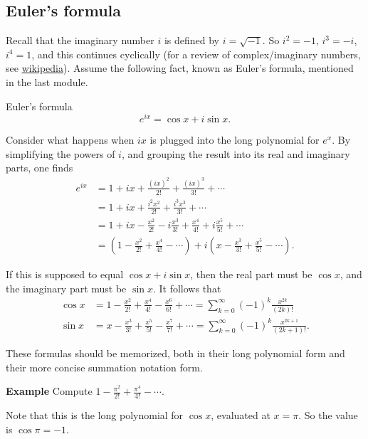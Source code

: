 \documentclass[twoside,openright,titlepage,a4paper]{book}
\begin{document}
\begin{sloppypar}
\subsection{Euler's formula}

Recall that the imaginary number $i$ is defined by ${i=\sqrt{-1}}$. So ${i^2=-1}$, ${i^3=-i}$, ${i^4=1}$, and this continues cyclically (for a review of complex/imaginary numbers, see \href{https://en.wikipedia.org/wiki/Complex_number}{wikipedia}). Assume the following fact, known as Euler's formula, mentioned in the last module.
\begin{examplebox}
Euler's formula
\begin{equation*} e^{ix} = \cos x + i \sin x. \end{equation*}
\end{examplebox}

Consider what happens when $ix$ is plugged into the long polynomial for ${e^x}$. By simplifying the powers of $i$, and grouping the result into its real and imaginary parts, one finds
\begin{align*} 
e^{ix} &= 1+ix+\frac{(ix)^2}{2!}+\frac{(ix)^3}{3!} + \dotsb\\
&= 1 + ix + \frac{i^2 x^2}{2!} + \frac{i^3 x^3}{3!} + \dotsb\\
&= 1 + ix - \frac{x^2}{2!} - i\frac{x^3}{3!} + \frac{x^4}{4!} + i \frac{x^5}{5!} + \dotsb\\
&= \left(1 - \frac{x^2}{2!} + \frac{x^4}{4!} - \dotsb\right) + i \left(x - \frac{x^3}{3!} + \frac{x^5}{5!} - \dotsb \right).
\end{align*}

If this is supposed to equal ${\cos x + i \sin x}$, then the real part must be ${\cos x}$, and the imaginary part must be ${\sin x}$. It follows that
\begin{align*}
\cos x &= 1 - \frac{x^2}{2!} + \frac{x^4}{4!} - \frac{x^6}{6!} + \dotsb = \sum_{k=0}^\infty (-1)^k \frac{x^{2k}}{(2k)!} \\
\sin x &= x - \frac{x^3}{3!} + \frac{x^5}{5!} - \frac{x^7}{7!} + \dotsb = \sum_{k=0}^\infty (-1)^k \frac{x^{2k+1}}{(2k+1)!}.
\end{align*}

These formulas should be memorized, both in their long polynomial form and their more concise summation notation form.

\textbf{Example} Compute ${1-\frac{\pi^2}{2!}+\frac{\pi^4}{4!}-\dotsb}$.
\begin{examplebox}
Note that this is the long polynomial for ${\cos x}$, evaluated at ${x=\pi}$. So the value is ${\cos \pi = -1}$.
\end{examplebox}


\end{sloppypar}
\end{document}
